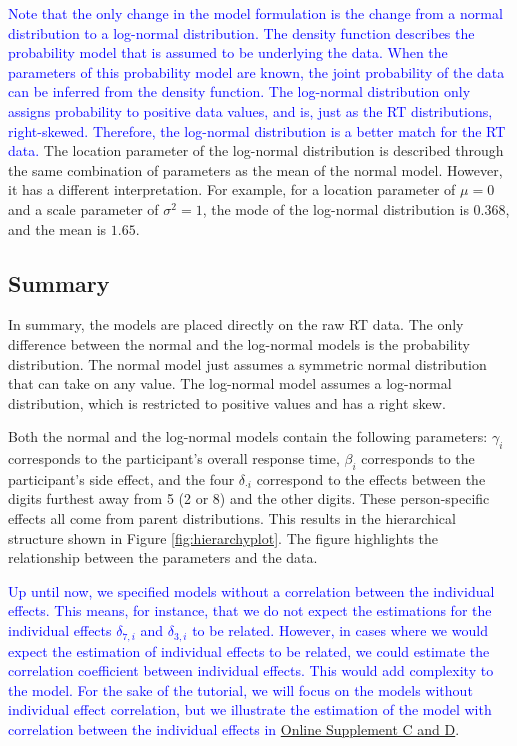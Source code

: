 \documentclass[
  english,
  doc,floatsintext]{apa6}
\begin{document}
\textcolor{blue}{Note that the only change in the model formulation is the change from a normal distribution to a log-normal distribution. The density function describes the probability model that is assumed to be underlying the data. When the parameters of this probability model are known, the joint probability of the data can be inferred from the density function. The log-normal distribution only assigns probability to positive data values, and is, just as the RT distributions, right-skewed. Therefore, the log-normal distribution is a better match for the RT data.} The location parameter of the log-normal distribution is described through the same combination of parameters as the mean of the normal model. However, it has a different interpretation. For example, for a location parameter of \(\mu = 0\) and a scale parameter of \(\sigma^2 = 1\), the mode of the log-normal distribution is \(0.368\), and the mean is \(1.65\).

\hypertarget{summary}{%
\subsection{Summary}\label{summary}}

In summary, the models are placed directly on the raw RT data. The only difference between the normal and the log-normal models is the probability distribution. The normal model just assumes a symmetric normal distribution that can take on any value. The log-normal model assumes a log-normal distribution, which is restricted to positive values and has a right skew.

Both the normal and the log-normal models contain the following parameters: \(\gamma_i\) corresponds to the participant's overall response time, \(\beta_i\) corresponds to the participant's side effect, and the four \(\delta_{\cdot i}\) correspond to the effects between the digits furthest away from 5 (2 or 8) and the other digits. These person-specific effects all come from parent distributions. This results in the hierarchical structure shown in Figure \ref{fig:hierarchyplot}. The figure highlights the relationship between the parameters and the data.

\textcolor{blue}{Up until now, we specified models without a correlation between the individual effects. This means, for instance, that we do not expect the estimations for the individual effects $\delta_{7, i}$ and $\delta_{3, i}$ to be related. However, in cases where we would expect the estimation of individual effects to be related, we could estimate the correlation coefficient between individual effects. This would add complexity to the model. For the sake of the tutorial, we will focus on the models without individual effect correlation, but we illustrate the estimation of the model with correlation between the individual effects in} \href{https://github.com/MyrtheV/Bayesian-Hierarchical-Modelling-An-Introduction-and-Reassessment}{Online Supplement C and D}.
\end{document}
